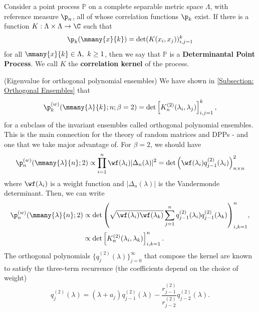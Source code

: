 \begin{definicao}
	Consider a point process $\mathbb{P}$ on a complete separable metric space $\Lambda$, with reference measure $\p_n$, all of whose correlation functions $\p_k$ exist. If there is a function $K: \Lambda \times \Lambda \rightarrow \C$ such that 
	\begin{equation}
		\p_k(\mmany{x}{k}) = \det(K(x_i, x_j))_{i,j = 1}^{k}
	\end{equation}
	for all $\mmany{x}{k} \in \Lambda, \ k \geq 1$, then we say that $\mathbb{P}$ is a \textbf{Determinantal Point Process}. We call $K$ the \textbf{correlation kernel} of the process. 
\end{definicao}

\begin{exemplo} (Eigenvalue for orthogonal polynomial ensembles)
	We have shown in \autoref{Subsection: Orthogonal Ensembles} that
	\begin{equation}
		 	\p_k^{(w)}(\mmany{\lambda}{k};n;\beta=2)  = \det\left[ K_n^{(2)}(\lambda_i, \lambda_j) \right]_{i,j=1}^{k},
	\end{equation}
	for a subclass of the invariant ensembles called orthogonal polynomial ensembles. This is the main connection for the theory of random matrices and DPPs - and one that we take major advantage of. For $\beta = 2$, we should have
	\begin{equation}
		\p_n^{(w)}(\mmany{\lambda}{n};2) \propto \prod_{i=1}^{n} \wf(\lambda_i) |\Delta_n(\lambda)|^2 = {\det\left(\wf(\lambda_i)q_{j-1}^{(2)}(\lambda_i)\right)}^2_{n\times n}
	\end{equation}
	where $ \wf(\lambda_i)$ is a weight function and $|\Delta_n(\lambda)|$ is the Vandermonde determinant. Then, we can write
	\begin{align}
		\p_n^{(w)}(\mmany{\lambda}{n};2) 
		&  \propto {\det\left(\sqrt{\wf(\lambda_i)\wf(\lambda_k)} \sum_{j=1}^{n} q_{j-1}^{(2)}(\lambda_i) q_{j-1}^{(2)}(\lambda_k) \right)}_{i,k=1}^{n}, \\
		& \propto \det\left[ K_n^{(2)}(\lambda_i, \lambda_k) \right]_{i,k=1}^{n}.
	\end{align}
	The orthogonal polynomials $\{q_j^{(2)}(\lambda)\}_{j=0}^\infty$ that compose the kernel are known to satisfy the three-term recurrence (the coefficients depend on the choice of weight)
	\begin{equation}
		q_{j}^{(2)}(\lambda) = (\lambda + a_j) q_{j-1}^{(2)}(\lambda) - \frac{r_{j-1}^{(2)}}{r_{j-2}^{(2)}} q_{j-2}^{(2)}(\lambda).
	\end{equation} 
\end{exemplo}


